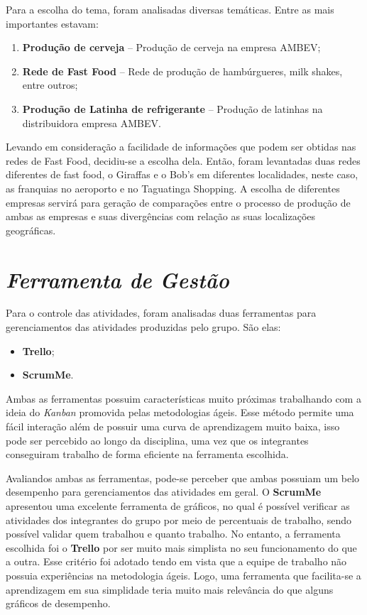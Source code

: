 		Para a escolha do tema, foram analisadas diversas temáticas. Entre as mais importantes estavam:

		\begin{enumerate}
			\item{\textbf{Produção de cerveja} – Produção de cerveja na empresa AMBEV;}
			\item{\textbf{Rede de Fast Food} – Rede de produção de hambúrgueres, milk shakes, entre outros;}
			\item{\textbf{Produção de Latinha de refrigerante} – Produção de latinhas na distribuidora empresa AMBEV.}
		\end{enumerate}

		Levando em consideração a facilidade de informações que podem ser obtidas nas redes de Fast Food, decidiu-se a escolha dela. Então, foram levantadas duas redes diferentes de fast food, o Giraffas e o Bob’s em diferentes localidades, neste caso, as franquias no aeroporto e no Taguatinga Shopping. A escolha de diferentes empresas servirá para geração de comparações entre o processo de produção de ambas as empresas e suas divergências com relação as suas localizações geográficas.

	\section[Ferramenta de Gestão]{\emph{Ferramenta de Gestão}}
	\label{sec:informacoesGerais_ferramenta}

		Para o controle das atividades, foram analisadas duas ferramentas para gerenciamentos das atividades produzidas pelo grupo. São elas:

		\begin{itemize}
			\item{\textbf{Trello};}
			\item{\textbf{ScrumMe}.}
		\end{itemize}

		Ambas as ferramentas possuim características muito próximas trabalhando com a ideia do \emph{Kanban} promovida pelas metodologias ágeis. Esse método permite uma fácil interação além de possuir uma curva de aprendizagem muito baixa, isso pode ser percebido ao longo da disciplina, uma vez que os integrantes conseguiram trabalho de forma eficiente na ferramenta escolhida.

		Avaliandos ambas as ferramentas, pode-se perceber que ambas possuiam um belo desempenho para gerenciamentos das atividades em geral. O \textbf{ScrumMe} apresentou uma excelente ferramenta de gráficos, no qual é possível verificar as atividades dos integrantes do grupo por meio de percentuais de trabalho, sendo possível validar quem trabalhou e quanto trabalho. No entanto, a ferramenta escolhida foi o \textbf{Trello} por ser muito mais simplista no seu funcionamento do que a outra. Esse critério foi adotado tendo em vista que a equipe de trabalho não possuia experiências na metodologia ágeis. Logo, uma ferramenta que facilita-se a aprendizagem em sua simplidade teria muito mais relevância do que alguns gráficos de desempenho.
